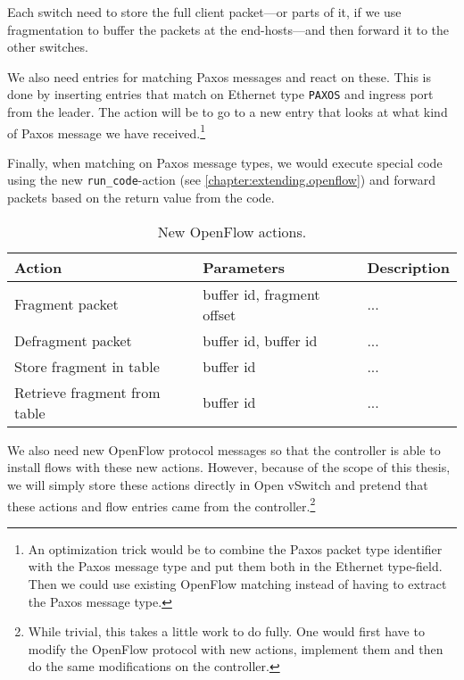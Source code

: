 Each switch need to store the full client packet---or parts of it, if we
use fragmentation to buffer the packets at the
end-hosts---and then forward
it to the other switches.

We also need entries for matching Paxos messages and react on these.
This is done by inserting entries that match on Ethernet type
\texttt{PAXOS} and ingress port from the leader.
The action will be to go to a new entry that looks at what kind of Paxos
message we have received.\footnote{An optimization trick would be to
combine the Paxos packet type identifier with the Paxos message type and put
them both in the Ethernet type-field.  Then we could use existing OpenFlow
matching instead of having to extract the Paxos message type.}

Finally, when matching on Paxos message types, we would execute 
special code using the new \texttt{run\_{}code}-action (see
    \vref{chapter:extending.openflow})
 and forward packets based on the return value from the code.

\begin{table}[H]
  \centering
  \begin{tabular}{|l|l|l|}
    \hline \textbf{Action} & \textbf{Parameters} & \textbf{Description} \\
    \hline Fragment packet & buffer id, fragment offset & ... \\
    \hline Defragment packet & buffer id, buffer id & ... \\
    \hline Store fragment in table & buffer id & ... \\
    \hline Retrieve fragment from table & buffer id & ... \\
    \hline
  \end{tabular}

  \caption{New OpenFlow actions.}
  \label{table:openflow.new.actions}
\end{table}

We also need new OpenFlow protocol messages so that the controller is able
to install flows with these new actions.  However, because of the scope of
this thesis, we will simply store these actions directly in Open
vSwitch and
pretend that these actions and flow entries came from the
controller.\footnote{While trivial, this takes a little work to do fully.
One would first have to modify the OpenFlow protocol with new
  actions,
implement them and then do the same modifications on the controller.}

